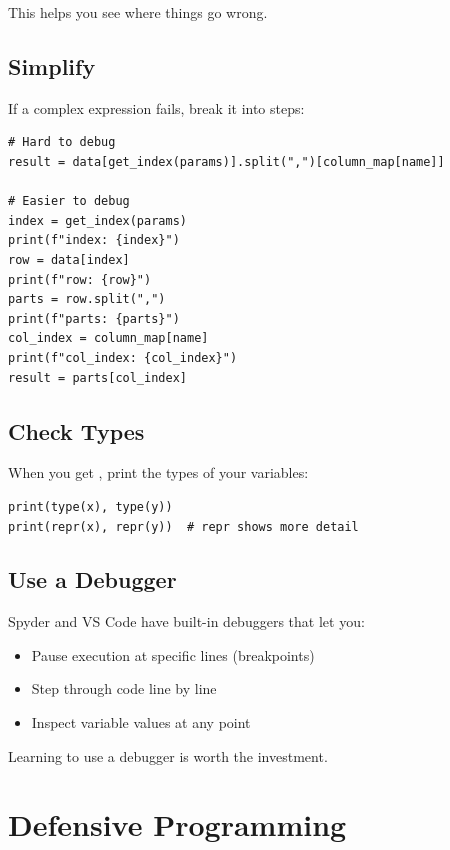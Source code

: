 This helps you see where things go wrong.

\subsection{Simplify}

If a complex expression fails, break it into steps:

\begin{lstlisting}
# Hard to debug
result = data[get_index(params)].split(",")[column_map[name]]

# Easier to debug
index = get_index(params)
print(f"index: {index}")
row = data[index]
print(f"row: {row}")
parts = row.split(",")
print(f"parts: {parts}")
col_index = column_map[name]
print(f"col_index: {col_index}")
result = parts[col_index]
\end{lstlisting}

\subsection{Check Types}

When you get , print the types of your variables:

\begin{lstlisting}
print(type(x), type(y))
print(repr(x), repr(y))  # repr shows more detail
\end{lstlisting}

\subsection{Use a Debugger}

Spyder and VS Code have built-in debuggers that let you:
\begin{itemize}
    \item Pause execution at specific lines (breakpoints)
    \item Step through code line by line
    \item Inspect variable values at any point
\end{itemize}

Learning to use a debugger is worth the investment.

\section{Defensive Programming}
\label{sec:defensive}

